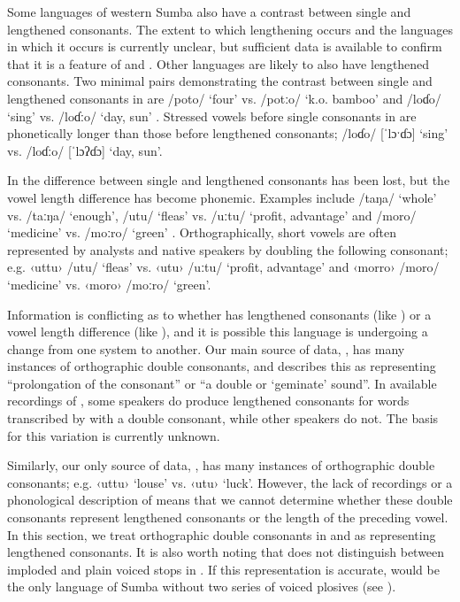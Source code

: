 Some languages of western Sumba also have a contrast between
single and lengthened consonants.
The extent to which lengthening occurs
and the languages in which it occurs is currently unclear,
but sufficient data is available to confirm that it is a feature
of  and .
Other languages are likely to also have lengthened consonants.
Two minimal pairs demonstrating the contrast between single
and lengthened consonants in  are /poto/ ‘four’ vs. /potːo/ ‘k.o.
bamboo’ and /loɗo/ ‘sing’ vs.
/loɗːo/ ‘day, sun’ \citep[36]{Lovestrand2021}.
Stressed vowels before single consonants in  are phonetically
longer than those before lengthened consonants; /loɗo/ [ˈlɔˑɗɔ] ‘sing’ vs.
/loɗːo/ [ˈlɔʔɗɔ] ‘day, sun’.

In  the difference between single
and lengthened consonants has been lost,
but the vowel length difference has become phonemic.
Examples include /taŋa/ ‘whole’ vs.
/taːŋa/ ‘enough’, /utu/ ‘fleas’ vs.
/uːtu/ ‘profit, advantage’
and /moro/ ‘medicine’ vs. /moːro/ ‘green’ \citep[19]{Verdizade2019a}.
Orthographically, short vowels are often represented by analysts
and native speakers by doubling the following consonant; e.g.
‹uttu› /utu/ ‘fleas’ vs.
‹utu› \mbox{/uːtu/} ‘profit, advantage’
and ‹morro› /moro/ ‘medicine’ vs. ‹moro› /moːro/ ‘green’.

Information is conflicting as to whether  has lengthened
consonants (like ) or a vowel length difference (like ),
and it is possible this language is undergoing a change from
one system to another.
Our main source of  data,
\citet{Mitchell2008a}, has many instances of orthographic double
consonants, and \citet{MitchellND} describes this as representing “prolongation
of the consonant” or “a double or ‘geminate’ sound”.
In available recordings of  \citep{LovestrandBalle2018},
some speakers do produce lengthened consonants
for words transcribed by \citet{Mitchell2008a} with a double
consonant, while other speakers do not.
The basis for this variation is currently unknown.

Similarly, our only source of  data,
\citet{Mitchell2008b}, has many instances of orthographic double consonants; e.g.
‹uttu› ‘louse’ vs. ‹utu› ‘luck’.
However, the lack of recordings or a phonological description
of  means that we cannot determine whether these double consonants
represent lengthened consonants or the length of the preceding vowel.
In this section, we treat orthographic double consonants in 
and  as representing lengthened consonants.
It is also worth noting that \citet{Mitchell2008b} does not distinguish
between imploded and plain voiced stops in .
If this representation is accurate,
 would be the only language of Sumba without two series of
voiced plosives (see ).